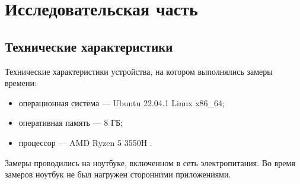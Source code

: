 \chapter{Исследовательская часть}

\section{Технические характеристики}

Технические характеристики устройства, на котором выполнялись замеры времени:

\begin{itemize}
	\item операционная система --- Ubuntu 22.04.1 Linux x86\_64;
	\item оперативная память --- 8 ГБ;
	\item процессор --- AMD Ryzen 5 3550H \cite{amd}.
\end{itemize}

Замеры проводились на ноутбуке, включенном в сеть электропитания.
Во время замеров ноутбук не был нагружен сторонними приложениями.



